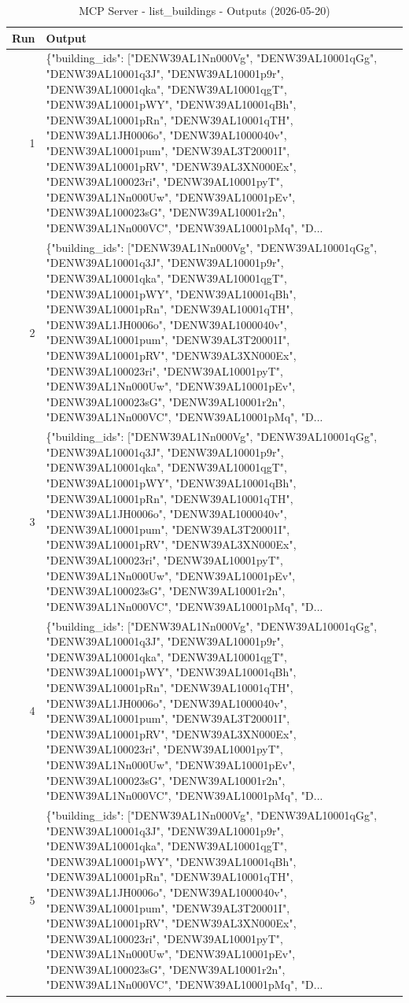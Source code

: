 \documentclass[a4paper,11pt]{article}
\begin{document}
\begin{table}[ht]
\centering
\scriptsize
\caption{MCP Server - list\_buildings - Outputs (2026-05-20)}
\label{tab:mcp\_list\_buildings\_outputs\_2026-05-20}
\begin{tabular}{r p{12cm}}
\hline
Run & Output \\
\hline
1 & \{"building\_ids": ["DENW39AL1Nn000Vg", "DENW39AL10001qGg", "DENW39AL10001q3J", "DENW39AL10001p9r", "DENW39AL10001qka", "DENW39AL10001qgT", "DENW39AL10001pWY", "DENW39AL10001qBh", "DENW39AL10001pRn", "DENW39AL10001qTH", "DENW39AL1JH0006o", "DENW39AL1000040v", "DENW39AL10001pum", "DENW39AL3T20001I", "DENW39AL10001pRV", "DENW39AL3XN000Ex", "DENW39AL100023ri", "DENW39AL10001pyT", "DENW39AL1Nn000Uw", "DENW39AL10001pEv", "DENW39AL100023sG", "DENW39AL10001r2n", "DENW39AL1Nn000VC", "DENW39AL10001pMq", "D... \\
2 & \{"building\_ids": ["DENW39AL1Nn000Vg", "DENW39AL10001qGg", "DENW39AL10001q3J", "DENW39AL10001p9r", "DENW39AL10001qka", "DENW39AL10001qgT", "DENW39AL10001pWY", "DENW39AL10001qBh", "DENW39AL10001pRn", "DENW39AL10001qTH", "DENW39AL1JH0006o", "DENW39AL1000040v", "DENW39AL10001pum", "DENW39AL3T20001I", "DENW39AL10001pRV", "DENW39AL3XN000Ex", "DENW39AL100023ri", "DENW39AL10001pyT", "DENW39AL1Nn000Uw", "DENW39AL10001pEv", "DENW39AL100023sG", "DENW39AL10001r2n", "DENW39AL1Nn000VC", "DENW39AL10001pMq", "D... \\
3 & \{"building\_ids": ["DENW39AL1Nn000Vg", "DENW39AL10001qGg", "DENW39AL10001q3J", "DENW39AL10001p9r", "DENW39AL10001qka", "DENW39AL10001qgT", "DENW39AL10001pWY", "DENW39AL10001qBh", "DENW39AL10001pRn", "DENW39AL10001qTH", "DENW39AL1JH0006o", "DENW39AL1000040v", "DENW39AL10001pum", "DENW39AL3T20001I", "DENW39AL10001pRV", "DENW39AL3XN000Ex", "DENW39AL100023ri", "DENW39AL10001pyT", "DENW39AL1Nn000Uw", "DENW39AL10001pEv", "DENW39AL100023sG", "DENW39AL10001r2n", "DENW39AL1Nn000VC", "DENW39AL10001pMq", "D... \\
4 & \{"building\_ids": ["DENW39AL1Nn000Vg", "DENW39AL10001qGg", "DENW39AL10001q3J", "DENW39AL10001p9r", "DENW39AL10001qka", "DENW39AL10001qgT", "DENW39AL10001pWY", "DENW39AL10001qBh", "DENW39AL10001pRn", "DENW39AL10001qTH", "DENW39AL1JH0006o", "DENW39AL1000040v", "DENW39AL10001pum", "DENW39AL3T20001I", "DENW39AL10001pRV", "DENW39AL3XN000Ex", "DENW39AL100023ri", "DENW39AL10001pyT", "DENW39AL1Nn000Uw", "DENW39AL10001pEv", "DENW39AL100023sG", "DENW39AL10001r2n", "DENW39AL1Nn000VC", "DENW39AL10001pMq", "D... \\
5 & \{"building\_ids": ["DENW39AL1Nn000Vg", "DENW39AL10001qGg", "DENW39AL10001q3J", "DENW39AL10001p9r", "DENW39AL10001qka", "DENW39AL10001qgT", "DENW39AL10001pWY", "DENW39AL10001qBh", "DENW39AL10001pRn", "DENW39AL10001qTH", "DENW39AL1JH0006o", "DENW39AL1000040v", "DENW39AL10001pum", "DENW39AL3T20001I", "DENW39AL10001pRV", "DENW39AL3XN000Ex", "DENW39AL100023ri", "DENW39AL10001pyT", "DENW39AL1Nn000Uw", "DENW39AL10001pEv", "DENW39AL100023sG", "DENW39AL10001r2n", "DENW39AL1Nn000VC", "DENW39AL10001pMq", "D... \\

\end{tabular}
\end{table}
\end{document}
